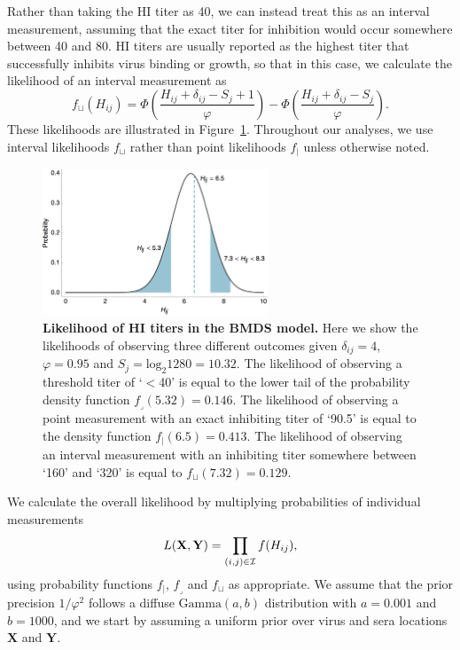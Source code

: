 \documentclass[11pt,oneside,letterpaper]{article}
\newcommand{\point}{f_{\scriptscriptstyle \vert}}	%
\newcommand{\threshold}{f_{\textstyle \lrcorner}}	%
\newcommand{\interval}{f_{\sqcup}}					%
\newcommand{\mdssd}{\varphi}						%
\begin{document}
Rather than taking the HI titer as 40, we can instead treat this as an interval measurement, assuming that the exact titer for inhibition would occur somewhere between 40 and 80.
HI titers are usually reported as the highest titer that successfully inhibits virus binding or growth, so that in this case, we calculate the likelihood of an interval measurement as
\begin{equation} 
	\interval(H_{ij}) = \Phi \left( \frac{ H_{ij} + \delta_{ij} - S_j + 1 }{ \mdssd } \right) - \Phi \left( \frac{ H_{ij} + \delta_{ij} - S_j }{\mdssd} \right).
\end{equation}
These likelihoods are illustrated in Figure~\ref{hij_likelihood}.
Throughout our analyses, we use interval likelihoods $\interval$ rather than point likelihoods $\point$ unless otherwise noted.

\begin{figure}[tb]
	\centering		
	\includegraphics[width=0.6\textwidth]{figures/hij_likelihood}
	\caption{\textbf{Likelihood of HI titers in the BMDS model.} 
	Here we show the likelihoods of observing three different outcomes given $\delta_{ij} = 4$, $\mdssd = 0.95$ and $S_j = \mathrm{log}_2 1280 = 10.32$.  
	The likelihood of observing a threshold titer of `$<$40' is equal to the lower tail of the probability density function $\threshold(5.32) = 0.146$.
	The likelihood of observing a point measurement with an exact inhibiting titer of `90.5' is equal to the density function $\point(6.5) = 0.413$.
	The likelihood of observing an interval measurement with an inhibiting titer somewhere between `160' and `320' is equal to $\interval(7.32) = 0.129.$
	} 
	\label{hij_likelihood} 
\end{figure}

We calculate the overall likelihood by multiplying probabilities of individual measurements
\begin{equation} 
	L(\mathbf{X},\mathbf{Y}) = \prod_{(i,j) \in \cal I} f(H_{ij}),
\end{equation}
using probability functions $\point$, $\threshold$ and $\interval$ as appropriate.
We assume that the prior precision $1/\mdssd^2$ follows a diffuse $\mbox{Gamma}(a, b)$ distribution with $a=0.001$ and $b=1000$, and we start by assuming a uniform prior over virus and sera locations $\mathbf{X}$ and $\mathbf{Y}$.
\end{document}
